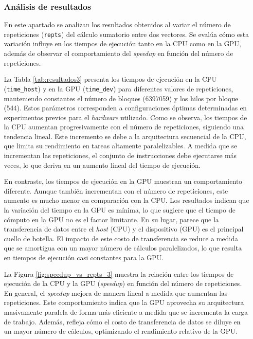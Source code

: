\documentclass{article}
\begin{document}
		\subsubsection{Análisis de resultados}

			En este apartado se analizan los resultados obtenidos al variar el número de repeticiones (\texttt{repts}) del cálculo sumatorio entre dos vectores. Se evalúa cómo esta variación influye en los tiempos de ejecución tanto en la CPU como en la GPU, además de observar el comportamiento del \textit{speedup} en función del número de repeticiones.

			La Tabla \ref{tab:resultados3} presenta los tiempos de ejecución en la CPU (\texttt{time\_host}) y en la GPU (\texttt{time\_dev}) para diferentes valores de repeticiones, manteniendo constantes el número de bloques (6397059) y los hilos por bloque (544). Estos parámetros corresponden a configuraciones óptimas determinadas en experimentos previos para el \textit{hardware} utilizado. Como se observa, los tiempos de la CPU aumentan progresivamente con el número de repeticiones, siguiendo una tendencia lineal. Este incremento se debe a la arquitectura secuencial de la CPU, que limita su rendimiento en tareas altamente paralelizables. A medida que se incrementan las repeticiones, el conjunto de instrucciones debe ejecutarse más veces, lo que deriva en un aumento lineal del tiempo de ejecución.

			En contraste, los tiempos de ejecución en la GPU muestran un comportamiento diferente. Aunque también incrementan con el número de repeticiones, este aumento es mucho menor en comparación con la CPU. Los resultados indican que la variación del tiempo en la GPU es mínima, lo que sugiere que el tiempo de cómputo en la GPU no es el factor limitante. En su lugar, parece que la transferencia de datos entre el \textit{host} (CPU) y el dispositivo (GPU) es el principal cuello de botella. El impacto de este costo de transferencia se reduce a medida que se amortigua con un mayor número de cálculos paralelizados, lo que resulta en tiempos de ejecución casi constantes para la GPU.

			La Figura \ref{fig:speedup_vs_repts_3} muestra la relación entre los tiempos de ejecución de la CPU y la GPU (\textit{speedup}) en función del número de repeticiones. En general, el \textit{speedup} mejora de manera lineal a medida que aumentan las repeticiones. Este comportamiento indica que la GPU aprovecha su arquitectura masivamente paralela de forma más eficiente a medida que se incrementa la carga de trabajo. Además, refleja cómo el costo de transferencia de datos se diluye en un mayor número de cálculos, optimizando el rendimiento relativo de la GPU.
\end{document}
